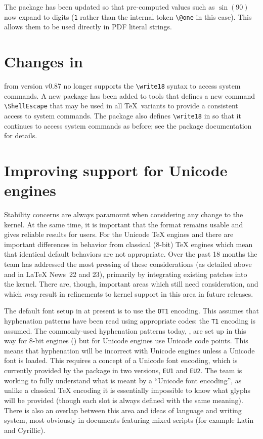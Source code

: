 \documentclass{ltnews}
\begin{document}
The  package has been updated so that pre-computed values
such as $\sin(90)$ now expand to digits (\texttt{1} rather than the
internal token \verb|\@one| in this case). This allows them to be used
directly in PDF literal strings. 

\section{Changes in }

 from version v0.87 no longer supports the
\verb|\write18| syntax to access system commands. A new package
 has been added to \textsf{tools} that defines a new
command \verb|\ShellEscape| that may be used in all \TeX\ variants to
provide a consistent access to system commands. The package also
defines \verb|\write18| in   so that it continues to access
system commands as before; see the package documentation for details.

\section{Improving support for Unicode engines}

Stability concerns are always paramount when considering any change to
the \LaTeXe{} kernel. At the same time, it is important that the format
remains usable and gives reliable results for users. For the Unicode
\TeX{} engines  and  there are important
differences in behavior from classical ($8$-bit) \TeX{} engines which
mean that identical default behaviors are not appropriate. Over the
past 18 months the team has addressed the most pressing of these
considerations (as detailed above and in \LaTeX{} News~22 and 23),
primarily by integrating existing patches into the kernel. There are,
though, important areas which still need consideration, and which
\emph{may} result in refinements to kernel support in this area in
future releases.

The default font setup in \LaTeXe{} at present is to use the \texttt{OT1}
encoding. This assumes that hyphenation patterns have been read using
appropriate codes: the \texttt{T1} encoding is assumed. The commonly-used
hyphenation patterns today, , are set up in this
way for $8$-bit engines () but for Unicode engines use
Unicode code points. This means that hyphenation will be incorrect
with Unicode engines unless a Unicode font is loaded. This requires
a concept of a Unicode font encoding, which is currently provided by
the  package in two versions, \texttt{EU1} and
\texttt{EU2}. The team is working to fully understand what is meant
by a ``Unicode font encoding'', as unlike a classical \TeX{} encoding
it is essentially impossible to know what glyphs will be provided
(though each slot is always defined with the same meaning).  There
is also an overlap between this area and ideas of language and writing
system, most obviously in documents featuring mixed scripts (for example
Latin and Cyrillic).
\end{document}
